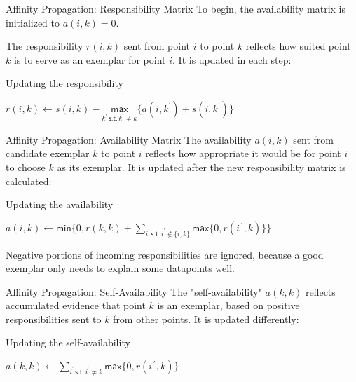 \documentclass{beamer}
\begin{document}
\begin{frame}{Affinity Propagation: Responsibility Matrix}
	To begin, the \alert{availability matrix} is initialized to $a(i,k) = 0$.
	
	The \alert{responsibility} $r(i,k)$ sent from point $i$ to point $k$ reflects how suited point $k$ is to serve as an \alert{exemplar} for point $i$. It is updated in each step:
	
	\begin{block}{Updating the responsibility}
		\begin{center}
			$r(i,k) \leftarrow s(i,k) - \underset{k^\prime\, \mathsf{s.t.}\, k^\prime \neq k}{\mathsf{max}} \{a(i,k^\prime) + s(i,k^\prime)\}$
		\end{center}
	\end{block}
\end{frame}

\begin{frame}{Affinity Propagation: Availability Matrix}
    The \alert{availability} $a(i,k)$ sent from candidate \alert{exemplar} $k$ to point $i$ reflects how appropriate it would be for point $i$ to choose $k$ as its \alert{exemplar}. It is updated after the new \alert{responsibility matrix} is calculated:
    
    \begin{block}{Updating the availability}
		\begin{center}
			$a(i,k) \leftarrow \mathsf{min}\{0,r(k,k) + \sum\limits_{i^\prime\,\mathsf{s.t.}\, i^\prime \notin \{i,k\}}\mathsf{max}\{0, r(i^{\, \prime} ,k)\}\}$
		\end{center}
    \end{block}
	Negative portions of incoming \alert{responsibilities} are ignored, because a good \alert{exemplar} only needs to explain some datapoints well.
\end{frame}

\begin{frame}{Affinity Propagation: Self-Availability}
    The "\alert{self-availability}" $a(k,k)$ reflects accumulated evidence that point $k$ is an \alert{exemplar}, based on positive \alert{responsibilities} sent to $k$ from other points. It is updated differently:
    
    \begin{block}{Updating the self-availability}
    	\begin{center}
    		$a(k,k) \leftarrow \sum\limits_{i^\prime\, \mathsf{s.t.}\, i^\prime \neq k} \mathsf{max} \{0, r(i^{\, \prime} ,k)\}$
    	\end{center}
    \end{block}
\end{frame}
\end{document}
